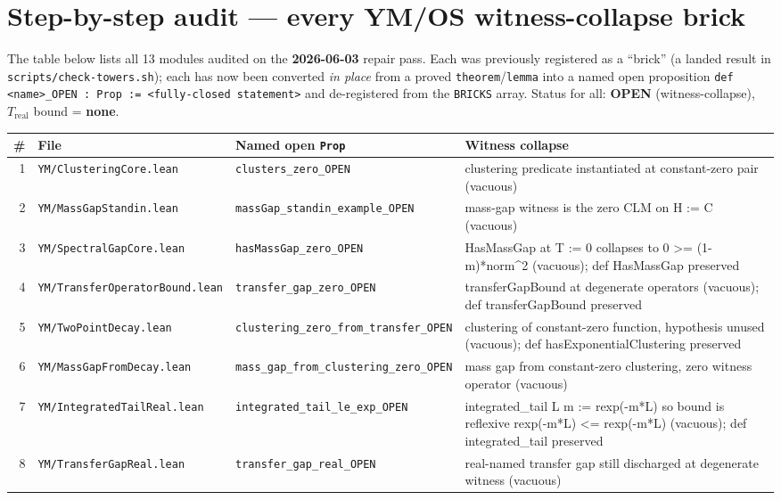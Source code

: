 \documentclass[11pt]{article}
\newcommand{\OPEN}{\textbf{\textsf{OPEN}}}
\begin{document}
\section{Step-by-step audit --- every YM/OS witness-collapse brick}
\label{sec:deriv}

The table below lists all 13 modules audited on the
\textbf{2026-06-03} repair pass. Each was previously registered as a ``brick''
(a landed result in \texttt{scripts/check-towers.sh}); each has now been
converted \emph{in place} from a proved \texttt{theorem}/\texttt{lemma} into a
named open proposition \verb|def <name>_OPEN : Prop := <fully-closed statement>|
and de-registered from the \texttt{BRICKS} array. Status for all: \OPEN{}
(witness-collapse), $T_{\mathrm{real}}$ bound = \textbf{none}.

{\small
\begin{longtable}{@{}r p{3.0cm} p{4.5cm} p{4.6cm}@{}}
\toprule
\# & File & Named open \texttt{Prop} & Witness collapse \\
\midrule
\endhead
1 & \texttt{YM/ClusteringCore.lean} & \texttt{clusters\_zero\_OPEN} & clustering predicate instantiated at constant-zero pair (vacuous) \\
2 & \texttt{YM/MassGapStandin.lean} & \texttt{massGap\_standin\_example\_OPEN} & mass-gap witness is the zero CLM on H := C (vacuous) \\
3 & \texttt{YM/SpectralGapCore.lean} & \texttt{hasMassGap\_zero\_OPEN} & HasMassGap at T := 0 collapses to 0 >= (1-m)*norm\textasciicircum{}2 (vacuous); def HasMassGap preserved \\
4 & \texttt{YM/TransferOperatorBound.lean} & \texttt{transfer\_gap\_zero\_OPEN} & transferGapBound at degenerate operators (vacuous); def transferGapBound preserved \\
5 & \texttt{YM/TwoPointDecay.lean} & \texttt{clustering\_zero\_from\_transfer\_OPEN} & clustering of constant-zero function, hypothesis unused (vacuous); def hasExponentialClustering preserved \\
6 & \texttt{YM/MassGapFromDecay.lean} & \texttt{mass\_gap\_from\_clustering\_zero\_OPEN} & mass gap from constant-zero clustering, zero witness operator (vacuous) \\
7 & \texttt{YM/IntegratedTailReal.lean} & \texttt{integrated\_tail\_le\_exp\_OPEN} & integrated\_tail L m := rexp(-m*L) so bound is reflexive rexp(-m*L) <= rexp(-m*L) (vacuous); def integrated\_tail preserved \\
8 & \texttt{YM/TransferGapReal.lean} & \texttt{transfer\_gap\_real\_OPEN} & real-named transfer gap still discharged at degenerate witness (vacuous) \\

\end{longtable}}
\end{document}
